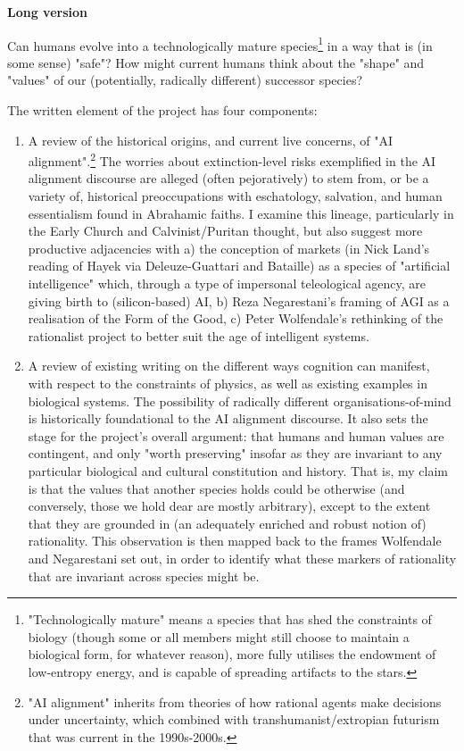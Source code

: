 \begin{abstractspacing}
\bigskip
\noindent\textbf{Long version}

Can humans evolve into a technologically mature species\footnote{"Technologically mature" means a species that has shed the constraints of biology (though some or all members might still choose to maintain a biological form, for whatever reason), more fully utilises the endowment of low-entropy energy, and is capable of spreading artifacts to the stars.} in a way that is (in some sense) "safe"? How might current humans think about the "shape" and "values" of our (potentially, radically different) successor species?

The written element of the project has four components:

\begin{enumerate}
\item A review of the historical origins, and current live concerns, of "AI alignment".\footnote{"AI alignment" inherits from theories of how rational agents make decisions under uncertainty, which combined with transhumanist/extropian futurism that was current in the 1990s-2000s.} The worries about extinction-level risks exemplified in the AI alignment discourse are alleged (often pejoratively) to stem from, or be a variety of, historical preoccupations with eschatology, salvation, and human essentialism found in Abrahamic faiths. I examine this lineage, particularly in the Early Church and Calvinist/Puritan thought, but also suggest more productive adjacencies with a) the conception of markets (in Nick Land's reading of Hayek via Deleuze-Guattari and Bataille) as a species of "artificial intelligence" which, through a type of impersonal teleological agency, are giving birth to (silicon-based) AI, b) Reza Negarestani's framing of AGI as a realisation of the Form of the Good, c) Peter Wolfendale's rethinking of the rationalist project to better suit the age of intelligent systems.

\item A review of existing writing on the different ways cognition can manifest, with respect to the constraints of physics, as well as existing examples in biological systems. The possibility of radically different organisations-of-mind is historically foundational to the AI alignment discourse. It also sets the stage for the project's overall argument: that humans and human values are contingent, and only "worth preserving" insofar as they are invariant to any particular biological and cultural constitution and history. That is, my claim is that the values that another species holds could be otherwise (and conversely, those we hold dear are mostly arbitrary), except to the extent that they are grounded in (an adequately enriched and robust notion of) rationality. This observation is then mapped back to the frames Wolfendale and Negarestani set out, in order to identify what these markers of rationality that are invariant across species might be.


\end{enumerate}
\end{abstractspacing}
